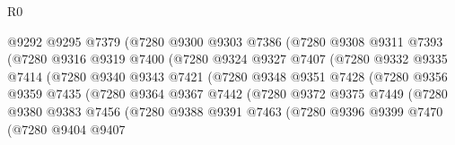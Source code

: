 \begin{lexlean}{R0}
\begin{coremodule}
                          @9292
                          @9295
                          @7379
                          (@7280
                            @9300
                            @9303
                            @7386
                            (@7280
                              @9308
                              @9311
                              @7393
                              (@7280
                                @9316
                                @9319
                                @7400
                                (@7280
                                  @9324
                                  @9327
                                  @7407
                                  (@7280
                                    @9332
                                    @9335
                                    @7414
                                    (@7280
                                      @9340
                                      @9343
                                      @7421
                                      (@7280
                                        @9348
                                        @9351
                                        @7428
                                        (@7280
                                          @9356
                                          @9359
                                          @7435
                                          (@7280
                                            @9364
                                            @9367
                                            @7442
                                            (@7280
                                              @9372
                                              @9375
                                              @7449
                                              (@7280
                                                @9380
                                                @9383
                                                @7456
                                                (@7280
                                                  @9388
                                                  @9391
                                                  @7463
                                                  (@7280
                                                    @9396
                                                    @9399
                                                    @7470
                                                    (@7280
                                                      @9404
                                                      @9407

\end{coremodule}
\end{lexlean}
